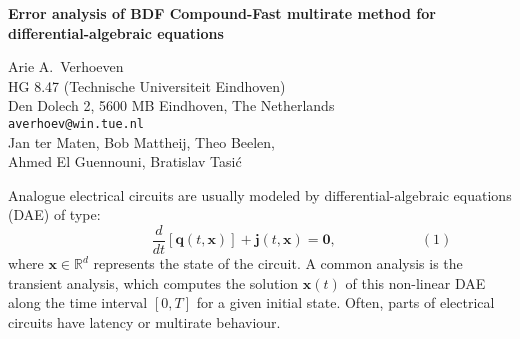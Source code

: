 \documentclass{report}
\newcommand{\Reals}{\mathbb{R}}
\begin{document}

\begin{center}
{\large
{\bf Error analysis of BDF Compound-Fast multirate method for \\
	differential-algebraic equations}}

	Arie A.~Verhoeven \\
	HG 8.47 (Technische Universiteit Eindhoven) \\
	Den Dolech 2, 5600 MB Eindhoven, The Netherlands \\
	{\tt averhoev@win.tue.nl} \\
	Jan ter Maten, Bob Mattheij, Theo Beelen, \\
	Ahmed El Guennouni, Bratislav Tasi\'c
\end{center}
Analogue electrical circuits are usually modeled by
differential-algebraic equations (DAE) of type:
$$
\qquad \qquad \qquad
\frac{d}{dt}\left[
\mathbf{q}(t,\mathbf{x})\right]+
\mathbf{j}(t,\mathbf{x})=\mathbf{0},
\qquad \qquad \qquad (1)
$$
where $\mathbf{x} \in \Reals^d$ represents the state of
the circuit. A common analysis is the transient analysis,
which computes the solution $\mathbf{x}(t)$ of this
non-linear DAE along the time interval $[0,T]$ for a given
initial state. Often, parts of electrical circuits have
latency or multirate behaviour.
\end{document}
